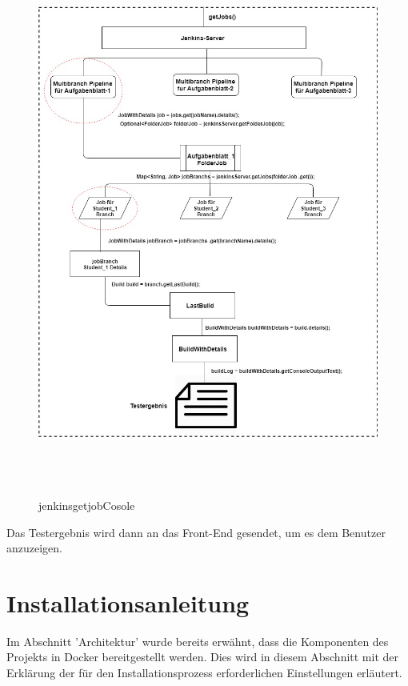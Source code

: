 \documentclass[a4paper,12pt,oneside]{book}
\begin{document}
 \begin{figure}[h!]
 	\begin{center}
 		\includegraphics[width=14cm, height=18cm]{TestergebnisOutput.jpg}
 		\caption{jenkinsgetjobCosole} 
 		\label{jenkinsgetjobCosole} 
 	\end{center}
 \end{figure}

Das Testergebnis wird dann an das Front-End gesendet, um es dem Benutzer anzuzeigen.
\section{Installationsanleitung}
Im Abschnitt 'Architektur' wurde bereits erwähnt, dass die Komponenten des Projekts in Docker bereitgestellt werden. Dies wird in diesem Abschnitt mit der Erklärung der für den Installationsprozess erforderlichen Einstellungen erläutert.
\end{document}
